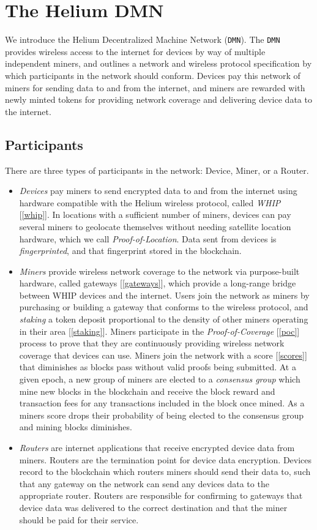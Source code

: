 \documentclass[10pt, nonatbib, nocopyrightspace, reprint]{sigplanconf}
\newcommand{\secref}[1]{[\autoref{#1}]}
\begin{document}
\section{The Helium DMN}

We introduce the Helium Decentralized Machine Network (\verb|DMN|). The \verb|DMN| provides wireless access to the internet for devices by way of multiple independent miners, and outlines a network and wireless protocol specification by which participants in the network should conform. Devices pay this network of miners for sending data to and from the internet, and miners are rewarded with newly minted tokens for providing network coverage and delivering device data to the internet.

\subsection{Participants}

There are three types of participants in the network: Device, Miner, or a Router.

\begin{itemize}
    \item \emph{Devices} pay miners to send encrypted data to and from the internet using hardware compatible with the Helium wireless protocol, called \emph{WHIP} \secref{whip}. In locations with a sufficient number of miners, devices can pay several miners to geolocate themselves without needing satellite location hardware, which we call \emph{Proof-of-Location}. Data sent from devices is \emph{fingerprinted}, and that fingerprint stored in the blockchain.
    \item \emph{Miners} provide wireless network coverage to the network via purpose-built hardware, called gateways \secref{gateways}, which provide a long-range bridge between WHIP devices and the internet. Users join the network as miners by purchasing or building a gateway that conforms to the wireless protocol, and \emph{staking} a token deposit proportional to the density of other miners operating in their area \secref{staking}. Miners participate in the \emph{Proof-of-Coverage} \secref{poc} process to prove that they are continuously providing wireless network coverage that devices can use. Miners join the network with a score \secref{scores} that diminishes as blocks pass without valid proofs being submitted. At a given epoch, a new group of miners are elected to a \emph{consensus group} which mine new blocks in the blockchain and receive the block reward and transaction fees for any transactions included in the block once mined. As a miners score drops their probability of being elected to the consensus group and mining blocks diminishes.
    \item \emph{Routers} are internet applications that receive encrypted device data from miners. Routers are the termination point for device data encryption. Devices record to the blockchain which routers miners should send their data to, such that any gateway on the network can send any devices data to the appropriate router. Routers are responsible for confirming to gateways that device data was delivered to the correct destination and that the miner should be paid for their service.
\end{itemize}
\end{document}
